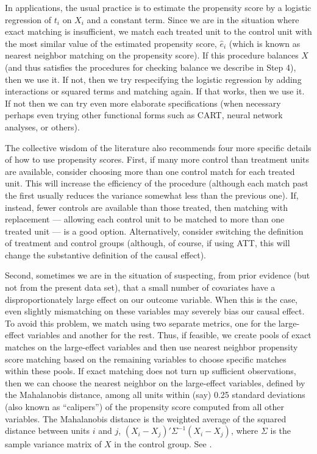 \documentclass[11pt,titlepage]{article}
\begin{document}
In applications, the usual practice is to estimate the propensity
score by a logistic regression of $t_i$ on $X_i$ and a constant term.
Since we are in the situation where exact matching is insufficient, we
match each treated unit to the control unit with the most similar
value of the estimated propensity score, $\hat{e}_i$ (which is known
as nearest neighbor matching on the propensity score).  If this
procedure balances $X$ (and thus satisfies the procedures for checking
balance we describe in Step 4), then we use it.  If not, then we try
respecifying the logistic regression by adding interactions or squared
terms and matching again.  If that works, then we use it.  If not then
we can try even more elaborate specifications (when necessary perhaps
even trying other functional forms such as CART, neural network
analyses, or others).

The collective wisdom of the literature also recommends four more
specific details of how to use propensity scores.  First, if many more
control than treatment units are available, consider choosing more
than one control match for each treated unit.  This will increase the
efficiency of the procedure (although each match past the first
usually reduces the variance somewhat less than the previous one).
If, instead, fewer controls are available than those treated, then
matching with replacement --- allowing each control unit to be matched
to more than one treated unit --- is a good option.  Alternatively,
consider switching the definition of treatment and control groups
(although, of course, if using ATT, this will change the substantive
definition of the causal effect).

Second, sometimes we are in the situation of suspecting, from prior
evidence (but not from the present data set), that a small number of
covariates have a disproportionately large effect on our outcome
variable.  When this is the case, even slightly mismatching on these
variables may severely bias our causal effect.  To avoid this problem,
we match using two separate metrics, one for the large-effect
variables and another for the rest.  Thus, if feasible, we create
pools of exact matches on the large-effect variables and then use
nearest neighbor propensity score matching based on the remaining
variables to choose specific matches within these pools.  If exact
matching does not turn up sufficient observations, then we can choose
the nearest neighbor on the large-effect variables, defined by the
Mahalanobis distance, among all units within (say) 0.25 standard
deviations (also known as ``calipers'') of the propensity score
computed from all other variables.  The Mahalanobis distance is the
weighted average of the squared distance between units $i$ and $j$,
$(X_i-X_j)'\Sigma^{-1}(X_i-X_j)$, where $\Sigma$ is the sample
variance matrix of $X$ in the control group.  See \cite{RubTho00}.
\end{document}

